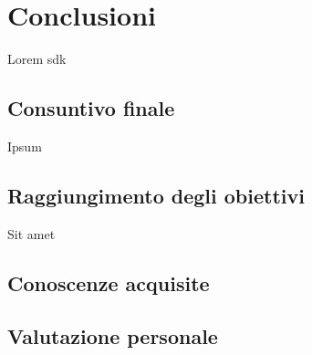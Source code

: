 
\chapter{Conclusioni}
\label{cap:conclusioni}
Lorem \gls{sdk}

\section{Consuntivo finale}

Ipsum

\section{Raggiungimento degli obiettivi}

Sit amet


\section{Conoscenze acquisite}

\section{Valutazione personale}
